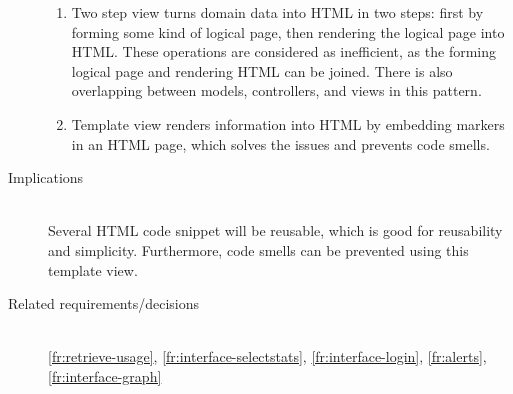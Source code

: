 \begin{description}
\begin{enumerate}
\item Two step view turns domain data into HTML in two steps: first by forming some kind of logical page, then rendering the logical page into HTML. These operations are considered as inefficient, as the forming logical page and rendering HTML can be joined. There is also overlapping between models, controllers, and views in this pattern.

\item Template view renders information into HTML by embedding markers in an HTML page, which solves the issues and prevents code smells.
\end{enumerate}

\item [Implications]~\\
Several HTML code snippet will be reusable, which is good for reusability and simplicity. Furthermore, code smells can be prevented using this template view.

\item [Related requirements/decisions]~\\
\ref{fr:retrieve-usage}, \ref{fr:interface-selectstats}, \ref{fr:interface-login}, \ref{fr:alerts}, \ref{fr:interface-graph}

\end{description}
